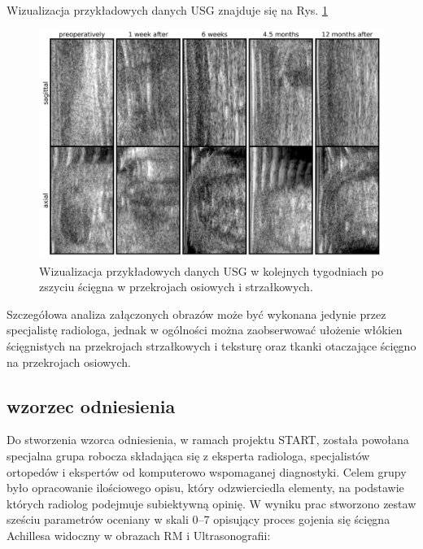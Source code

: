 Wizualizacja przykładowych danych USG znajduje się na Rys. \ref{fig:US_sample}
\begin{figure}[h!]
	\includegraphics[width=\textwidth]{figures/Data_US_sample.png}
	\caption{Wizualizacja przykładowych danych USG w kolejnych tygodniach po zszyciu ścięgna w przekrojach osiowych i strzałkowych.}
	\label{fig:US_sample}
\end{figure}

Szczegółowa analiza załączonych obrazów może być wykonana jedynie przez specjalistę radiologa, jednak w ogólności można zaobserwować ułożenie włókien ścięgnistych na przekrojach strzałkowych i teksturę oraz tkanki otaczające ścięgno na przekrojach osiowych.
 

\subsection{wzorzec odniesienia}

Do stworzenia wzorca odniesienia, w ramach projektu START, została powołana specjalna grupa robocza składająca się z eksperta radiologa, specjalistów ortopedów i ekspertów od komputerowo wspomaganej diagnostyki. Celem grupy było opracowanie ilościowego opisu, który odzwierciedla elementy, na podstawie których radiolog podejmuje subiektywną opinię. W wyniku prac stworzono zestaw sześciu parametrów oceniany w skali 0--7 opisujący proces gojenia się ścięgna Achillesa widoczny w obrazach RM i Ultrasonografii:

